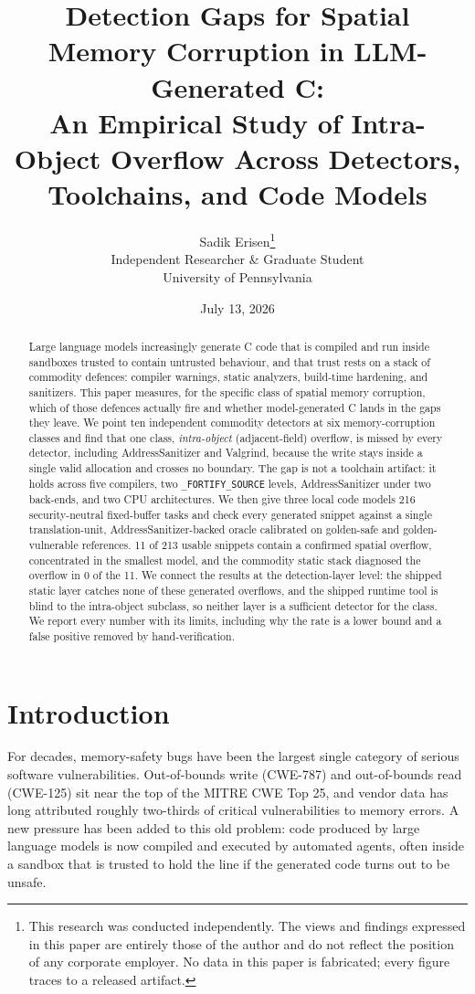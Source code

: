 \documentclass[11pt]{article}
\title{Detection Gaps for Spatial Memory Corruption in LLM-Generated C:\\
An Empirical Study of Intra-Object Overflow Across Detectors, Toolchains, and Code Models}
\author{Sadik Erisen\thanks{This research was conducted independently. The
views and findings expressed in this paper are entirely those of the author
and do not reflect the position of any corporate employer. No data in this
paper is fabricated; every figure traces to a released artifact.}\\[3pt]
\normalsize Independent Researcher \& Graduate Student\\
\normalsize University of Pennsylvania}
\date{July 13, 2026}
\newcommand{\Ntotal}{216}
\newcommand{\Nusable}{213}
\newcommand{\Nvuln}{11}
\newcommand{\StaticDiag}{0}
\begin{document}
\maketitle

\begin{abstract}
Large language models increasingly generate C code that is compiled and run inside
sandboxes trusted to contain untrusted behaviour, and that trust rests on a stack of
commodity defences: compiler warnings, static analyzers, build-time hardening, and
sanitizers. This paper measures, for the specific class of spatial memory corruption,
which of those defences actually fire and whether model-generated C lands in the gaps they
leave. We point ten independent commodity detectors at six memory-corruption classes and
find that one class, \emph{intra-object} (adjacent-field) overflow, is missed by every
detector, including AddressSanitizer and Valgrind, because the write stays inside a single
valid allocation and crosses no boundary. The gap is not a toolchain artifact: it holds
across five compilers, two \texttt{\_FORTIFY\_SOURCE} levels, AddressSanitizer under two
back-ends, and two CPU architectures. We then give three local code models \Ntotal{}
security-neutral fixed-buffer tasks and check every generated snippet against a single
translation-unit, AddressSanitizer-backed oracle calibrated on golden-safe and
golden-vulnerable references. \Nvuln{} of \Nusable{} usable snippets contain a confirmed
spatial overflow, concentrated in the smallest model, and the commodity static stack
diagnosed the overflow in \StaticDiag{} of the \Nvuln{}. We connect the results at the
detection-layer level: the shipped static layer catches none of these generated overflows,
and the shipped runtime tool is blind to the intra-object subclass, so neither layer is a
sufficient detector for the class. We report every number with its limits, including why
the rate is a lower bound and a false positive removed by hand-verification.
\end{abstract}

\section*{Introduction}

For decades, memory-safety bugs have been the largest single category of serious software
vulnerabilities. Out-of-bounds write (CWE-787) and out-of-bounds read (CWE-125) sit near
the top of the MITRE CWE Top 25, and vendor data has long attributed roughly two-thirds of
critical vulnerabilities to memory errors. A new pressure has been added to this old
problem: code produced by large language models is now compiled and executed by automated
agents, often inside a sandbox that is trusted to hold the line if the generated code turns
out to be unsafe.
\end{document}
